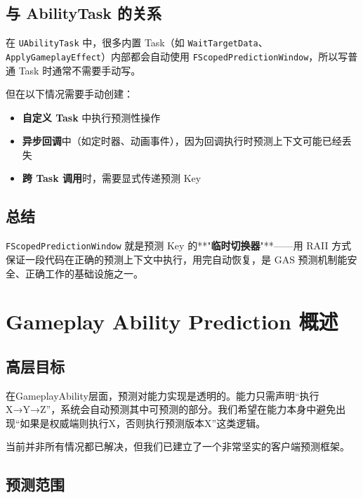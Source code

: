 \documentclass[10pt,CJKmath]{ctexart}
\begin{document}
\subsection{与 AbilityTask 的关系}

在 \texttt{UAbilityTask} 中，很多内置 Task（如 \texttt{WaitTargetData}、\texttt{ApplyGameplayEffect}）内部都会自动使用 \texttt{FScopedPredictionWindow}，所以写普通 Task 时通常不需要手动写。

但在以下情况需要手动创建：

\begin{itemize}
	\item \textbf{自定义 Task} 中执行预测性操作
	\item \textbf{异步回调}中（如定时器、动画事件），因为回调执行时预测上下文可能已经丢失
	\item \textbf{跨 Task 调用}时，需要显式传递预测 Key
\end{itemize}

\subsection{总结}

\texttt{FScopedPredictionWindow} 就是预测 Key 的**"\textbf{临时切换器}"**——用 RAII 方式保证一段代码在正确的预测上下文中执行，用完自动恢复，是 GAS 预测机制能安全、正确工作的基础设施之一。

\section{Gameplay Ability Prediction 概述}

\subsection{高层目标}
在GameplayAbility层面，预测对能力实现是透明的。能力只需声明“执行X→Y→Z”，系统会自动预测其中可预测的部分。我们希望在能力本身中避免出现“如果是权威端则执行X，否则执行预测版本X”这类逻辑。

当前并非所有情况都已解决，但我们已建立了一个非常坚实的客户端预测框架。

\subsection{预测范围}
\end{document}

